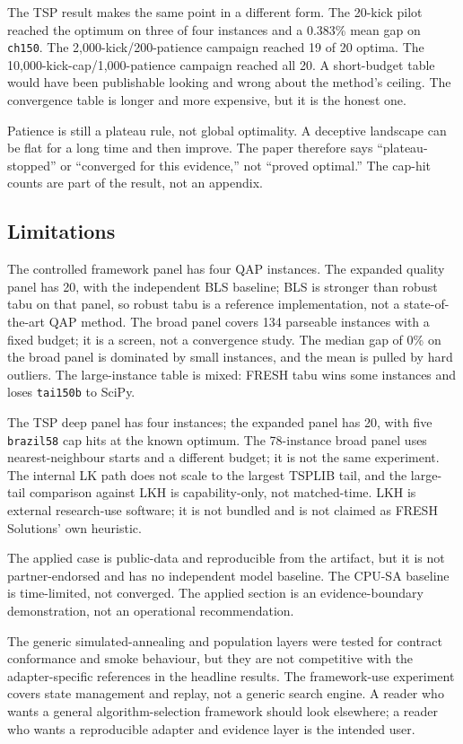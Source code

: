\documentclass[pdflatex,sn-mathphys-num]{sn-jnl}
\begin{document}
The TSP result makes the same point in a different form. The 20-kick pilot reached the optimum on three of four instances and a
0.383\% mean gap on \texttt{ch150}. The 2,000-kick/200-patience campaign reached 19 of 20 optima. The
10,000-kick-cap/1,000-patience campaign reached all 20. A short-budget table would have been publishable
looking and wrong about the method's ceiling. The convergence table is longer and more expensive, but
it is the honest one.

Patience is still a plateau rule, not global optimality. A deceptive landscape can be flat for a long
time and then improve. The paper therefore says “plateau-stopped” or “converged for this evidence,”
not “proved optimal.” The cap-hit counts are part of the result, not an appendix.

\subsection{Limitations}

The controlled framework panel has four QAP instances. The expanded quality panel has 20, with the
independent BLS baseline; BLS is stronger than robust tabu on that panel, so robust tabu is a
reference implementation, not a state-of-the-art QAP method. The broad panel covers 134 parseable
instances with a fixed budget; it is a screen, not a convergence study. The median gap of 0\% on the
broad panel is dominated by small instances, and the mean is pulled by hard outliers. The
large-instance table is mixed: FRESH tabu wins some instances and loses \texttt{tai150b} to SciPy.

The TSP deep panel has four instances; the expanded panel has 20, with five \texttt{brazil58} cap hits at the
known optimum. The 78-instance broad panel uses nearest-neighbour starts and a different budget; it
is not the same experiment. The internal LK path does not scale to
the largest TSPLIB tail, and the large-tail comparison against LKH is capability-only, not
matched-time. LKH is external research-use software; it is not bundled and is not claimed as FRESH
Solutions' own heuristic.

The applied case is public-data and reproducible from the artifact, but it is not partner-endorsed and
has no independent model baseline. The CPU-SA baseline is time-limited, not converged. The applied
section is an evidence-boundary demonstration, not an operational recommendation.

The generic simulated-annealing and population layers were tested for contract conformance and smoke
behaviour, but they are not competitive with the adapter-specific references in the headline results.
The framework-use experiment covers state management and replay, not a generic search engine. A reader
who wants a general algorithm-selection framework should look elsewhere; a reader who wants a
reproducible adapter and evidence layer is the intended user.
\end{document}
